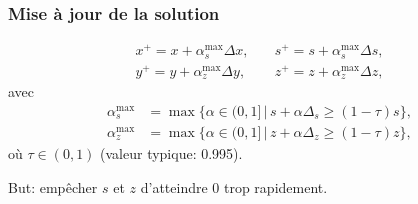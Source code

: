 \documentclass[usepdftitle=false,aspectratio=169]{beamer}
\begin{document}
\begin{frame}
\frametitle{Mise à jour de la solution}

\begin{align*}
x^+ = x + \alpha_s^{\max} \Delta x,
&\quad
s^+ = s + \alpha_s^{\max} \Delta s, \\
y^+ = y + \alpha_z^{\max} \Delta y,
&\quad
z^+ = z + \alpha_z^{\max} \Delta z,
\end{align*}
avec
\begin{align*}
\alpha_s^{\max} &= \max \{ \alpha \in (0,1] \,|\, s + \alpha \Delta_s \geq (1-\tau)s \},\\
\alpha_z^{\max} &= \max \{ \alpha \in (0,1] \,|\, z + \alpha \Delta_z \geq (1-\tau)z \},
\end{align*}
où $\tau \in (0,1)$ (valeur typique: 0.995).

\mbox{}

But: empêcher $s$ et $z$ d'atteindre 0 trop rapidement.

\end{frame}
\end{document}
